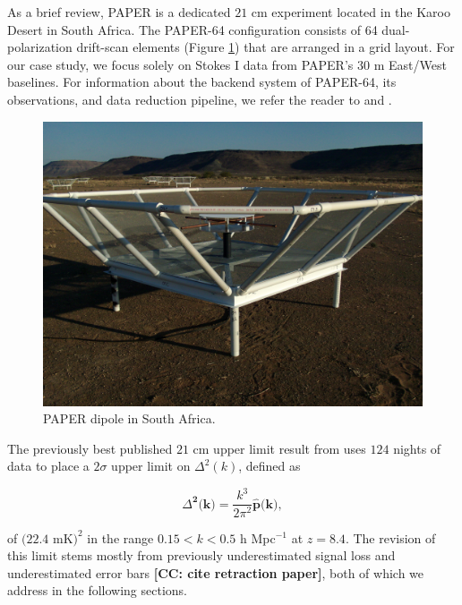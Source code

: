 \documentclass[preprint2,numberedappendix,tighten]{aastex6}  %
\newcommand{\cc}[1]{{\color{purple} \textbf{[CC: #1]}}}
\begin{document}
As a brief review, PAPER is a dedicated $21$ cm experiment located in the Karoo Desert in South Africa. The PAPER-64 configuration consists of 64 dual-polarization drift-scan elements (Figure \ref{fig:paper}) that are arranged in a grid layout. For our case study, we focus solely on Stokes I data from PAPER's $30$ m East/West baselines. For information about the backend system of PAPER-64, its observations, and data reduction pipeline, we refer the reader to \citet{parsons_et_al2010} and \citet{ali_et_al2015}.

\begin{figure}
	\centering
	\includegraphics[trim={0.3cm 0.3cm 0.3cm 0.3cm},width=\columnwidth]{plots/paper_dipole.png}
	\caption{PAPER dipole in South Africa.}
	\label{fig:paper}
\end{figure}

The previously best published $21$ cm upper limit result from \citet{ali_et_al2015} uses $124$ nights of data to place a $2\sigma$ upper limit on $\Delta^{2}(k)$, defined as

\begin{equation}
\Delta^{\textbf{2}}\textbf{(k)} = \frac{k^{3}}{2\pi^{2}}\hat{\textbf{p}}\textbf{(k)},
\end{equation}

\noindent of $(22.4$ mK$)^{2}$ in the range $0.15 < k < 0.5$ h Mpc$^{-1}$ at $z = 8.4$. The revision of this limit stems mostly from previously underestimated signal loss and underestimated error bars \cc{cite retraction paper}, both of which we address in the following sections. 
\end{document}

